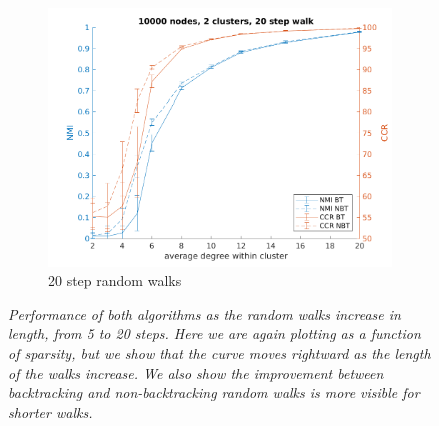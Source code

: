 \documentclass{article} %
\begin{document}
\begin{figure}[H]
\begin{subfigure}{0.33\textwidth}
        \includegraphics[width=\linewidth]{fig3/N10000K2len20}
        \caption{20 step random walks}
        \label{fig:subim33}
    \end{subfigure}
    \caption{\emph{Performance of both algorithms as the random walks increase in length, from 5 to 20 steps. Here we are again plotting as a function of sparsity, but we show that the curve moves rightward as the length of the walks increase. We also show the improvement between backtracking and non-backtracking random walks is more visible for shorter walks.}}
    \label{fig:image3}
\end{figure}
\end{document}
